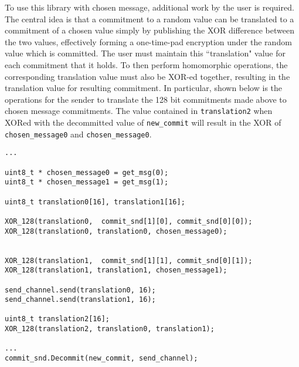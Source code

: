 To use this library with chosen message, additional work by the user is required. The central idea is that a commitment to a random value can be translated to a commitment of a chosen value simply by publishing the XOR difference between the two values, effectively forming a one-time-pad encryption under the random value which is committed. The user must maintain this ``translation" value for each commitment that it holds. To then perform homomorphic operations, the corresponding translation value must also be XOR-ed together, resulting in the translation value for resulting commitment. In particular, shown below is the operations for the sender to translate the 128 bit commitments made above to chosen message commitments. The value contained in \texttt{translation2} when XORed with the decommitted value of \texttt{new\_commit} will result in the XOR of \texttt{chosen\_message0} and \texttt{chosen\_message0}.
\begin{lstlisting}     
...

uint8_t * chosen_message0 = get_msg(0);
uint8_t * chosen_message1 = get_msg(1);

uint8_t translation0[16], translation1[16];

XOR_128(translation0,  commit_snd[1][0], commit_snd[0][0]);
XOR_128(translation0, translation0, chosen_message0);


XOR_128(translation1,  commit_snd[1][1], commit_snd[0][1]);
XOR_128(translation1, translation1, chosen_message1);

send_channel.send(translation0, 16);
send_channel.send(translation1, 16);

uint8_t translation2[16];
XOR_128(translation2, translation0, translation1);

...
commit_snd.Decommit(new_commit, send_channel);
\end{lstlisting}


